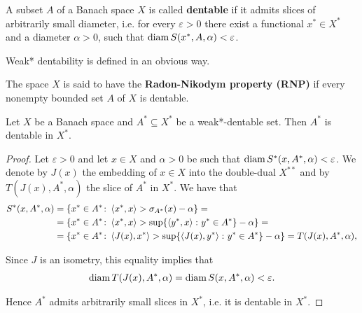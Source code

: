 \begin{definition}\cite[definition 5.1]{Phelps1993}
  \label{def:dentability}
  A subset \( A \) of a Banach space \( X \) is called \textbf{dentable} if it admits slices of arbitrarily small diameter, i.e. for every \( \varepsilon > 0 \) there exist a functional \( x^* \in X^* \) and a diameter \( \alpha > 0 \), such that \( \operatorname{diam} S(x^*, A, \alpha) < \varepsilon \).

  Weak* dentability is defined in an obvious way.
\end{definition}

\begin{definition}\cite[definition 5.2]{Phelps1993}
  \label{def:radon-nikodym-property}
  The space \( X \) is said to have the \textbf{Radon-Nikodym property (RNP)} if every nonempty bounded set \( A \) of \( X \) is dentable.
\end{definition}

\begin{proposition}
  \label{thm:weak_dentable_sets_are_dentable}
  Let \( X \) be a Banach space and \( A^* \subseteq X^* \) be a weak*-dentable set. Then \( A^* \) is dentable in \( X^* \).
\end{proposition}
\begin{proof}
  Let \( \varepsilon > 0 \) and let \( x \in X \) and \( \alpha > 0 \) be such that \( \operatorname{diam} S^*(x, A^*, \alpha) < \varepsilon \).
  We denote by \( J(x) \) the embedding of \( x \in X \) into the double-dual \( X^{**} \) and by \( T(J(x), A^*, \alpha) \) the slice of \( A^* \) in \( X^* \). We have that
  \begin{align*}
    S^*(x, A^*, \alpha)
    &=
    \{ x^* \in A^* \colon \left\langle x^*, x \right\rangle > \sigma_{A^*}(x) - \alpha \}
    = \\ &=
    \{ x^* \in A^* \colon \left\langle x^*, x \right\rangle > \sup \{ \left\langle y^*, x \right\rangle \colon y^* \in A^* \} - \alpha \}
    = \\ &=
    \{ x^* \in A^* \colon \left\langle J(x), x^* \right\rangle > \sup \{ \left\langle J(x), y^* \right\rangle \colon y^* \in A^* \} - \alpha \}
    =
    T(J(x), A^*, \alpha),
  \end{align*}

  Since \( J \) is an isometry, this equality implies that
  \begin{align*}
    \operatorname{diam} T(J(x), A^*, \alpha) = \operatorname{diam} S(x, A^*, \alpha) < \varepsilon.
  \end{align*}

  Hence \( A^* \) admits arbitrarily small slices in \( X^* \), i.e. it is dentable in \( X^* \).
\end{proof}
